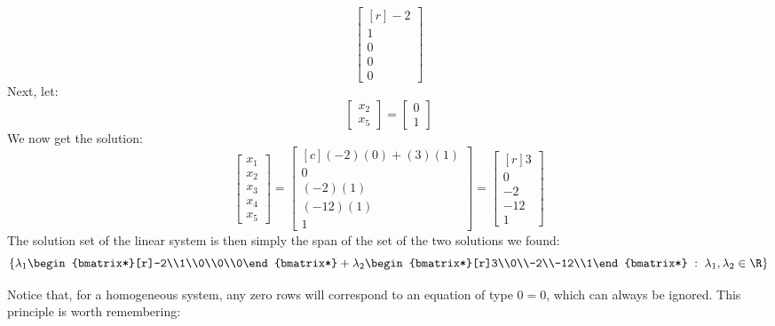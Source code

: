 \documentclass[12pt]{article}
\begin{document}
\begin{example}
\[\begin{bmatrix*}[r]-2\\1\\0\\0\\0\end{bmatrix*}
\]
Next, let:
\[
\begin{bmatrix}x_2\\x_5\end{bmatrix}=\begin{bmatrix}0\\1\end{bmatrix}
\]
We now get the solution:
\[
\begin{bmatrix}x_1\\x_2\\x_3\\x_4\\x_5\end{bmatrix}=
\begin{bmatrix*}[c](-2)(0)+(3)(1)\\0\\(-2)(1)\\(-12)(1)\\1\end{bmatrix*}=
\begin{bmatrix*}[r]3\\0\\-2\\-12\\1\end{bmatrix*}
\]
The solution set of the linear system is then simply the span of the set of the two solutions we found:
\[
\left\{
\lambda_1\begin{bmatrix*}[r]-2\\1\\0\\0\\0\end{bmatrix*}+
\lambda_2\begin{bmatrix*}[r]3\\0\\-2\\-12\\1\end{bmatrix*}
\;:\;\lambda_1, \lambda_2\in\R
\right\}
\]
\end{example}
\proofend

Notice that, for a homogeneous system, any zero rows will correspond to an equation of type $0=0$, which can always be ignored. This principle is worth remembering:
\end{document}
